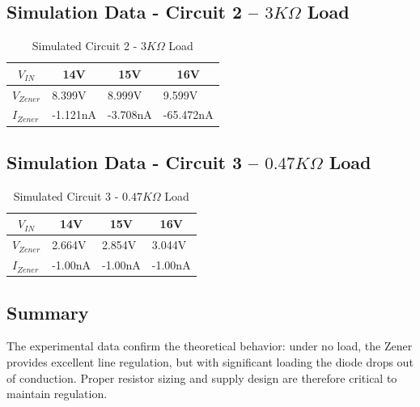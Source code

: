 \documentclass[12pt]{article}
\begin{document}
\subsection{Simulation Data - Circuit 2 -- $3K\Omega$ Load}
\begin{table}[H]
  \caption{Simulated Circuit 2 - $3K\Omega$ Load}\label{tab:sim3kload}
  \begin{center}
    \begin{tabular}[c]{|l|l|l|l|}
      \hline
      \multicolumn{1}{|c|}{\textbf{$V_{IN}$}} &
      \multicolumn{1}{|c|}{\textbf{14V}} &
      \multicolumn{1}{|c|}{\textbf{15V}} &
      \multicolumn{1}{|c|}{\textbf{16V}} \\
      \hline
      \textbf{$V_{Zener}$} & 8.399V & 8.999V & 9.599V \\
      \textbf{$I_{Zener}$} & -1.121nA & -3.708nA & -65.472nA \\
      \hline
    \end{tabular}
  \end{center}
\end{table}

\subsection{Simulation Data - Circuit 3 -- $0.47K\Omega$ Load}
\begin{table}[H]
  \caption{Simulated Circuit 3 - $0.47K\Omega$ Load}\label{tab:sim47kload}
  \begin{center}
    \begin{tabular}[c]{|l|l|l|l|}
      \hline
      \multicolumn{1}{|c|}{\textbf{$V_{IN}$}} &
      \multicolumn{1}{|c|}{\textbf{14V}} &
      \multicolumn{1}{|c|}{\textbf{15V}} &
      \multicolumn{1}{|c|}{\textbf{16V}} \\
      \hline
      \textbf{$V_{Zener}$} & 2.664V & 2.854V & 3.044V \\
      \textbf{$I_{Zener}$} & -1.00nA & -1.00nA & -1.00nA \\
      \hline
    \end{tabular}
  \end{center}
\end{table}

\subsection{Summary}
The experimental data confirm the theoretical behavior: under no load, the Zener
provides excellent line regulation, but with significant loading the diode drops
out of conduction. Proper resistor sizing and supply design are therefore
critical to maintain regulation.
\end{document}
